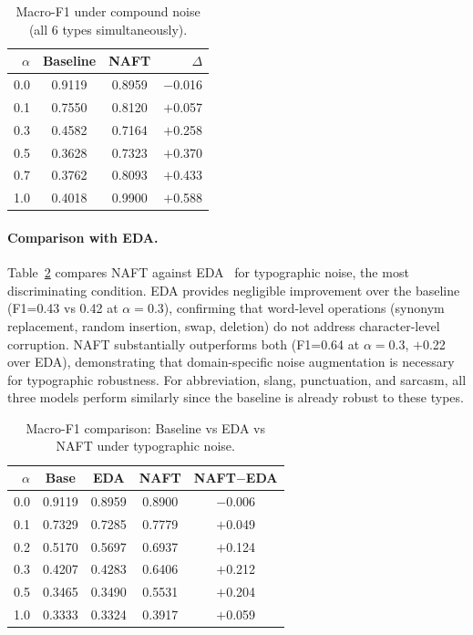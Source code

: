 \documentclass[sigconf]{acmart}
\begin{document}
\begin{table}[h]
  \centering\footnotesize\setlength{\tabcolsep}{4pt}
  \caption{Macro-F1 under compound noise (all 6 types simultaneously).}
  \label{tab:compound}
  \begin{tabular}{rccr}
    \toprule
    $\alpha$ & \textbf{Baseline} & \textbf{NAFT} & $\Delta$ \\
    \midrule
    0.0 & 0.9119 & 0.8959 & $-$0.016 \\
    0.1 & 0.7550 & 0.8120 & $+$0.057 \\
    0.3 & 0.4582 & 0.7164 & $+$0.258 \\
    0.5 & 0.3628 & 0.7323 & $+$0.370 \\
    0.7 & 0.3762 & 0.8093 & $+$0.433 \\
    1.0 & 0.4018 & 0.9900 & $+$0.588 \\
    \bottomrule
  \end{tabular}
\end{table}

\paragraph{Comparison with EDA.}
Table~\ref{tab:eda} compares NAFT against EDA~\cite{wei2019eda}
for typographic noise, the most discriminating condition.
EDA provides negligible improvement over the baseline (F1=0.43 vs
0.42 at $\alpha=0.3$), confirming that word-level operations
(synonym replacement, random insertion, swap, deletion) do not
address character-level corruption.
NAFT substantially outperforms both (F1=0.64 at $\alpha=0.3$,
$+$0.22 over EDA), demonstrating that domain-specific noise
augmentation is necessary for typographic robustness.
For abbreviation, slang, punctuation, and sarcasm, all three models
perform similarly since the baseline is already robust to these
types.

\begin{table}[h]
  \centering\footnotesize\setlength{\tabcolsep}{4pt}
  \caption{Macro-F1 comparison: Baseline vs EDA vs NAFT
           under typographic noise.}
  \label{tab:eda}
  \begin{tabular}{rcccc}
    \toprule
    $\alpha$ & \textbf{Base} & \textbf{EDA} & \textbf{NAFT} & \textbf{NAFT$-$EDA} \\
    \midrule
    0.0 & 0.9119 & 0.8959 & 0.8900 & $-$0.006 \\
    0.1 & 0.7329 & 0.7285 & 0.7779 & $+$0.049 \\
    0.2 & 0.5170 & 0.5697 & 0.6937 & $+$0.124 \\
    0.3 & 0.4207 & 0.4283 & 0.6406 & $+$0.212 \\
    0.5 & 0.3465 & 0.3490 & 0.5531 & $+$0.204 \\
    1.0 & 0.3333 & 0.3324 & 0.3917 & $+$0.059 \\
    \bottomrule
  \end{tabular}
\end{table}
\end{document}
